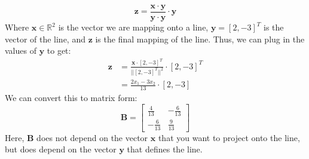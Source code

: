 \begin{enumerate}[label=(\alph*)]
\begin{tcolorbox}
		      $$
			      \mathbf{z} = \frac{\mathbf{x} \cdot \mathbf{y}}{\mathbf{y}
				      \cdot \mathbf{y}} \cdot \mathbf{y}
		      $$
		      Where $\mathbf{x} \in \mathbb{R}^2$ is the vector we are mapping
		      onto a line, $\mathbf{y} = \left[ 2, -3 \right]^T$ is the vector of the
		      line, and $\mathbf{z}$ is the final mapping of the line. Thus, we
		      can plug in the values of $\mathbf{y}$ to get:
		      $$
			      \begin{aligned}
				      \mathbf{z} & = \frac{\mathbf{x} \cdot \left[ 2, -3
						      \right]^T}{|| \left[ 2, -3 \right]^T ||^2} \cdot
				      \left[ 2, -3 \right]^T                                   \\
				                 & = \frac{2x_1 - 3x_2}{13} \cdot \left[ 2, -3
					      \right]
			      \end{aligned}
		      $$
		      We can convert this to matrix form:
		      $$
			      \mathbf{B} =
			      \begin{bmatrix}
				      \frac{4}{13}  & -\frac{6}{13} \\
				      -\frac{6}{13} & \frac{9}{13}
			      \end{bmatrix}
		      $$
		      Here, $\mathbf{B}$ does not depend on the vector $\mathbf{x}$ that
		      you want to project onto the line, but does depend on the vector
		      $\mathbf{y}$ that defines the line.
	      \end{tcolorbox}
\end{enumerate}
